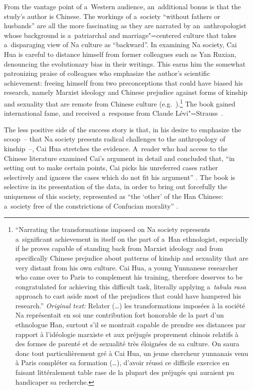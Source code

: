 \largerpage[-2]
From the vantage point of a~Western audience, an~additional bonus is that the study’s author is
Chinese. The workings of a~society “without fathers or husbands” are all the more fascinating as
they are narrated by an~anthropologist whose background is a~patriarchal and marriage"=centered
culture that takes a~disparaging view of Na culture as “backward”. In examining Na society, Cai
Hua is careful to distance himself from former colleagues such as Yan Ruxian, denouncing the
evolutionary bias in their writings. This earns him the somewhat patronizing praise of
colleagues who emphasize the author’s scientific achievement: freeing himself from two
preconceptions that could have biased his research, namely Marxist ideology and Chinese
prejudice against forms of kinship and sexuality that are remote from Chinese
culture (e.g.\ \citealt[57--58]{cartieretal1998}).\footnote{“Narrating the transformations imposed on Na society represents a~significant achievement in itself on the part of a~Han ethnologist, especially if he proves capable of standing back from Marxist ideology and from specifically Chinese prejudice about patterns of kinship and sexuality that are very distant from his own culture. Cai Hua, a young Yunnanese researcher who came over to Paris to complement his training, therefore deserves to be congratulated for achieving this difficult task, literally applying a~\textit{tabula rasa} approach to cast aside most of the prejudices that could have hampered his research.” \textit{Original text:} Relater ({\dots}) les transformations
	imposées à la société Na représentait en soi une contribution fort honorable de la part d’un
	ethnologue Han, surtout s’il se montrait capable de prendre ses distances par rapport à
	l’idéologie marxiste et aux préjugés proprement chinois relatifs à des formes de parenté et de
	sexualité très éloignées de sa culture. On saura donc tout particulièrement gré à Cai Hua, un
	jeune chercheur yunnanais venu à Paris compléter sa formation ({\dots}), d’avoir réussi ce difficile
	exercice en faisant littéralement table rase de la plupart des préjugés qui auraient pu
	handicaper sa recherche.} The book gained international fame, and received a~response from Claude Lévi"=Strauss~\citep{levistrauss2004}.

The less positive side of the success story is that, in his desire to emphasize the scoop~-- that Na
society presents radical challenges to the anthropology of kinship~--, Cai Hua stretches the
evidence. A~reader who had access to the Chinese literature examined Cai’s
argument in detail and concluded that, “in setting out to make certain points, Cai picks his
unreferred cases rather selectively and ignores the cases which do not fit his argument”
\citep{wellens2003}. The book is selective in its presentation of the data, in order to
bring out forcefully the uniqueness of this society, represented as “the ‘other’ of the Han Chinese:
a~society free of the constrictions of Confucian morality” \citep[147]{wellens2003}. 

